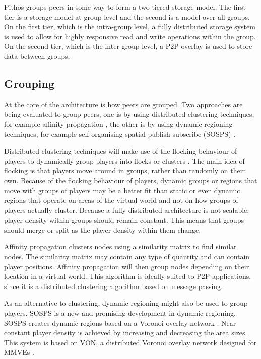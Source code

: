 \documentclass[10pt,a4paper,conference]{IEEEtran}
\begin{document}
Pithos groups peers in some way to form a two tiered storage model. The first tier is a storage model at group level and the second is a model over
all groups. On the first tier, which is the intra-group level, a fully distributed storage system is used to allow for highly responsive read and
write operations within the group. On the second tier, which is the inter-group level, a P2P overlay is used to store data between groups.

\subsection{Grouping}

At the core of the architecture is how peers are grouped. Two approaches are being evaluated to group peers, one is by using distributed clustering
techniques, for example affinity propagation \cite{affinity_propagation}, the other is by using dynamic regioning techniques, for example
self-organising spatial publish subscribe (SOSPS) \cite{self_organising_sps_post}.

Distributed clustering techniques will make use of the flocking behaviour of players to dynamically group players into flocks or clusters
\cite{flocking}. The main idea of flocking is that players move around in groups, rather than randomly on their own. Because of the flocking
behaviour of players, dynamic groups or regions that move with groups of players may be a better fit than static or even dynamic regions that operate
on areas of the virtual world and not on how groups of players actually cluster. Because a fully distributed architecture is not scalable, player
density within groups should remain constant. This means that groups should merge or split as the player density within them change.

Affinity propagation clusters nodes using a similarity matrix to find similar nodes. The similarity matrix may contain any type of quantity and can
contain player positions. Affinity propagation will then group nodes depending on their location in a virtual world. This algorithm is ideally suited
to P2P applications, since it is a distributed clustering algorithm based on message passing.

As an alternative to clustering, dynamic regioning might also be used to group players. SOSPS is a new and promising development in dynamic
regioning. SOSPS creates dynamic regions based on a Voronoi overlay network \cite{voronoi_diagrams_survey}. Near constant player density is achieved
by increasing and decreasing the area sizes. This system is based on VON, a distributed Voronoi overlay network designed for MMVEs \cite{VON_VAST}.
\end{document}
